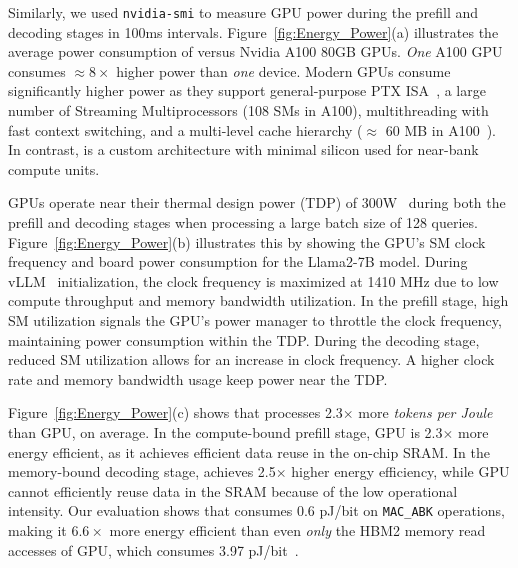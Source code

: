 Similarly, we used \texttt{nvidia-smi} to measure GPU power during the prefill and decoding stages in 100ms intervals. Figure~\ref{fig:Energy_Power}(a) illustrates the average power consumption of \att{} versus Nvidia A100 80GB GPUs. 
\textit{One} A100 GPU consumes $\approx8\times$ higher power than \textit{one} \att{} device. Modern GPUs consume significantly higher power as they support general-purpose PTX ISA~\cite{PTX-ISA}, a large number of Streaming Multiprocessors (108 SMs in A100), multithreading with fast context switching, and a multi-level cache hierarchy ($\approx$ 60 MB in A100~\cite{a100}). In contrast, \att{} is a custom architecture with minimal silicon used for near-bank compute units. 





GPUs operate near their thermal design power (TDP) of 300W~\cite{a100} during both the prefill and decoding stages when processing a large batch size of 128 queries.
Figure~\ref{fig:Energy_Power}(b) illustrates this by showing the GPU’s SM clock frequency and board power consumption for the Llama2-7B model.
During vLLM~\cite{vLLM} initialization, the clock frequency is maximized at 1410 MHz due to low compute throughput and memory bandwidth utilization.
In the prefill stage, high SM utilization signals the GPU’s power manager to throttle the clock frequency, maintaining power consumption within the TDP.
During the decoding stage, reduced SM utilization allows for an increase in clock frequency. A higher clock rate and memory bandwidth usage keep power near the TDP.



Figure~\ref{fig:Energy_Power}(c) shows that \att{} processes 2.3$\times$ more \emph{tokens per Joule} than GPU, on average.
In the compute-bound prefill stage, GPU is 2.3$\times$ more energy efficient, as it achieves efficient data reuse in the on-chip SRAM.
In the memory-bound decoding stage, \att{} achieves 2.5$\times$ higher energy efficiency, while GPU cannot efficiently reuse data in the SRAM because of the low operational intensity.
Our evaluation shows that \att{} consumes 0.6 pJ/bit on \texttt{MAC\_ABK} operations, making it $6.6\times$ more energy efficient than even \textit{only} the HBM2 memory read accesses of GPU, which consumes 3.97 pJ/bit~\cite{o2017fine}.



